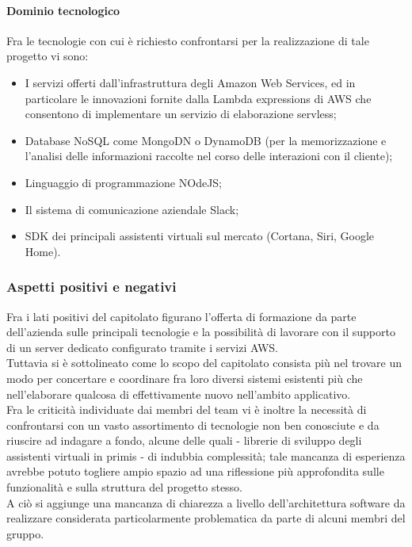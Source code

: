 			\paragraph{Dominio tecnologico}
			Fra le tecnologie con cui è richiesto confrontarsi per la realizzazione di tale progetto vi sono:
			\begin{itemize}
				\item I servizi offerti dall'infrastruttura degli Amazon Web Services, ed in particolare le innovazioni fornite dalla Lambda expressions 
				di AWS che consentono di implementare un servizio di elaborazione servless;
				\item Database NoSQL come MongoDN o DynamoDB (per la memorizzazione e l'analisi delle informazioni raccolte nel corso delle interazioni con il cliente);
				\item Linguaggio di programmazione NOdeJS;
				\item Il sistema di comunicazione aziendale Slack;
				\item SDK dei principali assistenti virtuali sul mercato (Cortana, Siri, Google Home).
			\end{itemize}
		\subsubsection{Aspetti positivi e negativi}
		Fra i lati positivi del capitolato figurano l'offerta di formazione da parte dell'azienda sulle principali tecnologie e la possibilità di 
		lavorare con il supporto di un server dedicato configurato tramite i servizi AWS.\\
		Tuttavia si è sottolineato come lo scopo del capitolato consista più nel trovare un modo per concertare e coordinare fra loro diversi sistemi 
		esistenti più che nell'elaborare qualcosa di effettivamente nuovo nell'ambito applicativo.\\
		Fra le criticità individuate dai membri del team vi è inoltre la necessità di confrontarsi con un vasto assortimento di tecnologie non ben 
		conosciute e da riuscire ad indagare a fondo, alcune delle quali - librerie di sviluppo degli assistenti virtuali in primis - di indubbia 
		complessità; tale mancanza di esperienza avrebbe potuto togliere ampio spazio ad una riflessione più approfondita sulle funzionalità e sulla 
		struttura del progetto stesso.\\
		A ciò si aggiunge una mancanza di chiarezza a livello dell'architettura software da realizzare considerata particolarmente problematica da 
		parte di alcuni membri del gruppo.
